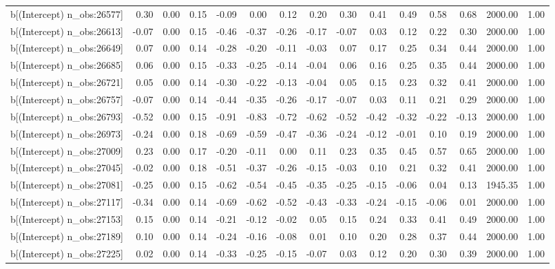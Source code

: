 \begin{table}[ht]
\begin{tabular}{rrrrrrrrrrrrrrr}
  b[(Intercept) n\_obs:26577] & 0.30 & 0.00 & 0.15 & -0.09 & 0.00 & 0.12 & 0.20 & 0.30 & 0.41 & 0.49 & 0.58 & 0.68 & 2000.00 & 1.00 \\ 
  b[(Intercept) n\_obs:26613] & -0.07 & 0.00 & 0.15 & -0.46 & -0.37 & -0.26 & -0.17 & -0.07 & 0.03 & 0.12 & 0.22 & 0.30 & 2000.00 & 1.00 \\ 
  b[(Intercept) n\_obs:26649] & 0.07 & 0.00 & 0.14 & -0.28 & -0.20 & -0.11 & -0.03 & 0.07 & 0.17 & 0.25 & 0.34 & 0.44 & 2000.00 & 1.00 \\ 
  b[(Intercept) n\_obs:26685] & 0.06 & 0.00 & 0.15 & -0.33 & -0.25 & -0.14 & -0.04 & 0.06 & 0.16 & 0.25 & 0.35 & 0.44 & 2000.00 & 1.00 \\ 
  b[(Intercept) n\_obs:26721] & 0.05 & 0.00 & 0.14 & -0.30 & -0.22 & -0.13 & -0.04 & 0.05 & 0.15 & 0.23 & 0.32 & 0.41 & 2000.00 & 1.00 \\ 
  b[(Intercept) n\_obs:26757] & -0.07 & 0.00 & 0.14 & -0.44 & -0.35 & -0.26 & -0.17 & -0.07 & 0.03 & 0.11 & 0.21 & 0.29 & 2000.00 & 1.00 \\ 
  b[(Intercept) n\_obs:26793] & -0.52 & 0.00 & 0.15 & -0.91 & -0.83 & -0.72 & -0.62 & -0.52 & -0.42 & -0.32 & -0.22 & -0.13 & 2000.00 & 1.00 \\ 
  b[(Intercept) n\_obs:26973] & -0.24 & 0.00 & 0.18 & -0.69 & -0.59 & -0.47 & -0.36 & -0.24 & -0.12 & -0.01 & 0.10 & 0.19 & 2000.00 & 1.00 \\ 
  b[(Intercept) n\_obs:27009] & 0.23 & 0.00 & 0.17 & -0.20 & -0.11 & 0.00 & 0.11 & 0.23 & 0.35 & 0.45 & 0.57 & 0.65 & 2000.00 & 1.00 \\ 
  b[(Intercept) n\_obs:27045] & -0.02 & 0.00 & 0.18 & -0.51 & -0.37 & -0.26 & -0.15 & -0.03 & 0.10 & 0.21 & 0.32 & 0.41 & 2000.00 & 1.00 \\ 
  b[(Intercept) n\_obs:27081] & -0.25 & 0.00 & 0.15 & -0.62 & -0.54 & -0.45 & -0.35 & -0.25 & -0.15 & -0.06 & 0.04 & 0.13 & 1945.35 & 1.00 \\ 
  b[(Intercept) n\_obs:27117] & -0.34 & 0.00 & 0.14 & -0.69 & -0.62 & -0.52 & -0.43 & -0.33 & -0.24 & -0.15 & -0.06 & 0.01 & 2000.00 & 1.00 \\ 
  b[(Intercept) n\_obs:27153] & 0.15 & 0.00 & 0.14 & -0.21 & -0.12 & -0.02 & 0.05 & 0.15 & 0.24 & 0.33 & 0.41 & 0.49 & 2000.00 & 1.00 \\ 
  b[(Intercept) n\_obs:27189] & 0.10 & 0.00 & 0.14 & -0.24 & -0.16 & -0.08 & 0.01 & 0.10 & 0.20 & 0.28 & 0.37 & 0.44 & 2000.00 & 1.00 \\ 
  b[(Intercept) n\_obs:27225] & 0.02 & 0.00 & 0.14 & -0.33 & -0.25 & -0.15 & -0.07 & 0.03 & 0.12 & 0.20 & 0.30 & 0.39 & 2000.00 & 1.00 \\ 

\end{tabular}
\end{table}
